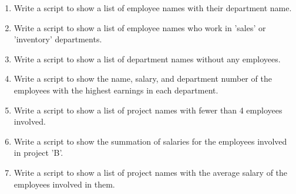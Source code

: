 \documentclass{homework}
\begin{document}
\begin{enumerate}
\item Write a script to show a list of employee names with their department name.

\item Write a script to show a list of employee names who work in 'sales' or 'inventory' departments.

\item Write a script to show a list of department names without any employees.

\item Write a script to show the name, salary, and department number of the employees with the highest earnings in each department.

\item Write a script to show a list of project names with fewer than 4 employees involved.

\item Write a script to show the summation of salaries for the employees involved in project 'B'.

\item Write a script to show a list of project names with the average salary of the employees involved in them.
\end{enumerate}









% 


% 
% 
\end{document}
